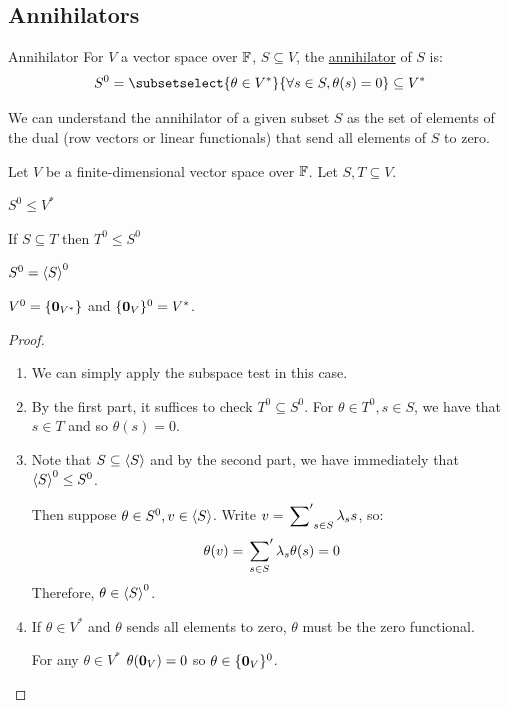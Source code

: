\documentclass[../Main.tex]{subfiles}
\begin{document}
\subsection{Annihilators}
\begin{definition}{Annihilator}
    For $V$ a vector space over $\mathbb{F}$, $S \subseteq V$, the \underline{annihilator} of $S$ is:
    \begin{equation*}
        S^0 = \subsetselect{\theta \in V^*}{\forall s \in S, \theta(s) = 0} \subseteq V^*
    \end{equation*}
\end{definition}
We can understand the annihilator of a given subset $S$ as the set of elements of the dual (row vectors or linear functionals) that send all elements of $S$ to zero.
\begin{propositions}{
        Let $V$ be a finite-dimensional vector space over $\mathbb{F}$. Let $S, T \subseteq V$.
        \label{propsAnnihilator}
    }
    \item $S^0 \leq V^*$ \label{propAnnihilatorIsSubspace}
    \item If $S \subseteq T$ then $T^0 \leq S^0$ \label{propAnnihilatorInclReverse}
    \item $S^0 = \left\langle S \right\rangle^0$ \label{propAnnihilatorSpan}
    \item $V^0 = \{\boldsymbol{0}_{V^*}\}$ and $\{\boldsymbol{0}_V\}^0 = V^*$. \label{propAnnihilatorExtremes}
\end{propositions}
\begin{proof}
    \begin{enumerate}
        \item We can simply apply the subspace test in this case.
        \item By the first part, it suffices to check $T^0 \subseteq S^0$. For $\theta \in T^0, s \in S$, we have that $s \in T$ and so $\theta(s) = 0$.
        \item Note that $S \subseteq \left\langle S \right\rangle$ and by the second part, we have immediately that $\left\langle S \right\rangle^0 \leq S^0$.
        
            Then suppose $\theta \in S^0, v \in \left\langle S \right\rangle$. Write $v = \sideset{}{'}\sum_{s \in S} \lambda_s s$, so:
            \begin{equation*}
                \theta(v) = \sideset{}{'}\sum_{s \in S} \lambda_s \theta(s) = 0
            \end{equation*}
            Therefore, $\theta \in \left\langle S \right\rangle^0$.
        \item If $\theta \in V^*$ and $\theta$ sends all elements to zero, $\theta$ must be the zero functional.
        
        For any $\theta \in V^*$ $\theta(\boldsymbol{0}_V) = 0$ so $\theta \in \{\boldsymbol{0}_V\}^0$.
    \end{enumerate}
\end{proof}
\end{document}
